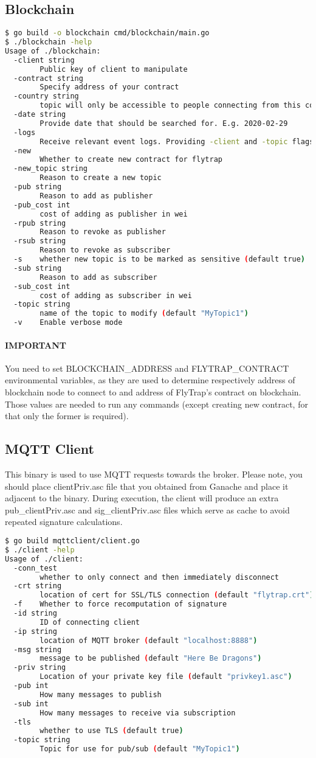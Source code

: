 \subsection{Blockchain}
\begin{lstlisting}[language=bash,breaklines=true]
$ go build -o blockchain cmd/blockchain/main.go
$ ./blockchain -help
Usage of ./blockchain:
  -client string
    	Public key of client to manipulate
  -contract string
    	Specify address of your contract
  -country string
    	topic will only be accessible to people connecting from this country. 2 letter ISO code. (default "GB")
  -date string
    	Provide date that should be searched for. E.g. 2020-02-29
  -logs
    	Receive relevant event logs. Providing -client and -topic flags will restrict the search only to relevant fields.
  -new
    	Whether to create new contract for flytrap
  -new_topic string
    	Reason to create a new topic
  -pub string
    	Reason to add as publisher
  -pub_cost int
    	cost of adding as publisher in wei
  -rpub string
    	Reason to revoke as publisher
  -rsub string
    	Reason to revoke as subscriber
  -s	whether new topic is to be marked as sensitive (default true)
  -sub string
    	Reason to add as subscriber
  -sub_cost int
    	cost of adding as subscriber in wei
  -topic string
    	name of the topic to modify (default "MyTopic1")
  -v	Enable verbose mode
\end{lstlisting}
\paragraph{IMPORTANT} You need to set BLOCKCHAIN\_ADDRESS and FLYTRAP\_CONTRACT environmental variables, as they are used to determine respectively address of blockchain node to connect to and address of FlyTrap's contract on blockchain. Those values are needed to run any commands (except creating new contract, for that only the former is required).
\subsection{MQTT Client}
This binary is used to use MQTT requests towards the broker. Please note, you should place clientPriv.asc file that you obtained from Ganache and place it adjacent to the binary. During execution, the client will produce an extra pub\_clientPriv.asc and sig\_clientPriv.asc files which serve as cache to avoid repeated signature calculations. 
\begin{lstlisting}[language=bash,breaklines=true]
$ go build mqttclient/client.go
$ ./client -help
Usage of ./client:
  -conn_test
    	whether to only connect and then immediately disconnect
  -crt string
    	location of cert for SSL/TLS connection (default "flytrap.crt")
  -f	Whether to force recomputation of signature
  -id string
    	ID of connecting client
  -ip string
    	location of MQTT broker (default "localhost:8888")
  -msg string
    	message to be published (default "Here Be Dragons")
  -priv string
    	Location of your private key file (default "privkey1.asc")
  -pub int
    	How many messages to publish
  -sub int
    	How many messages to receive via subscription
  -tls
    	whether to use TLS (default true)
  -topic string
    	Topic for use for pub/sub (default "MyTopic1")
\end{lstlisting}
